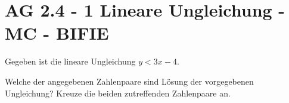 \section{AG 2.4 - 1 Lineare Ungleichung  - MC - BIFIE}

\begin{beispiel}[AG 2.4]{1} %
Gegeben ist die lineare Ungleichung $y<3x-4$.

\leer

Welche der angegebenen Zahlenpaare sind Lösung der vorgegebenen Ungleichung? Kreuze die beiden zutreffenden Zahlenpaare an.  

\end{beispiel}